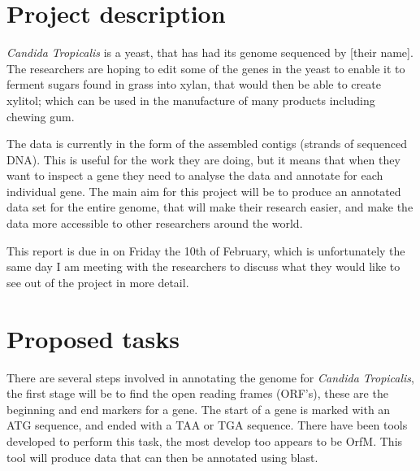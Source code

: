 \documentclass[11pt,fleqn,twoside]{article}
\begin{document}
\wordcount{}

\mmp

\setcounter{tocdepth}{3} %


\section{Project description}
\textit{Candida Tropicalis} is a yeast, that has had its genome sequenced by [their name]. The researchers are hoping to edit some of the genes in the yeast to enable it to ferment sugars found in grass into xylan, that would then be able to create xylitol; which can be used in the manufacture of many products including chewing gum. 

The data is currently in the form of the assembled contigs (strands of sequenced DNA). This is useful for the work they are doing, but it means that when they want to inspect a gene they need to analyse the data and annotate for each individual gene. The main aim for this project will be to produce an annotated data set for the entire genome, that will make their research easier, and make the data more accessible to other researchers around the world. 

This report is due in on Friday the 10th of February, which is unfortunately the same day I am meeting with the researchers to discuss what they would like to see out of the project in more detail. 


\section{Proposed tasks}
There are several steps involved in annotating the genome for \textit{Candida Tropicalis}, the first stage will be to find the open reading frames (ORF's), these are the beginning and end markers for a gene. The start of a gene is marked with an ATG sequence, and ended with a TAA or TGA sequence. There have been tools developed to perform this task, the most develop too appears to be OrfM\cite{OrfM}. This tool will produce data that can then be annotated using blast. 
\end{document}
